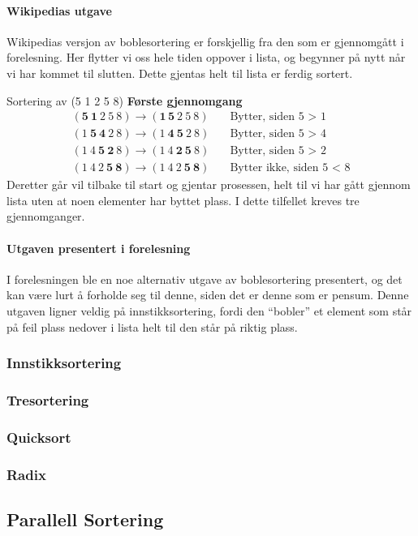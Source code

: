 \paragraph*{Wikipedias utgave}
Wikipedias versjon av boblesortering er forskjellig fra den som er gjennomgått i forelesning.
Her flytter vi oss hele tiden oppover i lista, og begynner på nytt når vi har kommet til slutten.
Dette gjentas helt til lista er ferdig sortert.

\begin{eks} Sortering av (5 1 2 5 8) \newline
  \textbf{Første gjennomgang}
  \begin{align*}
    (\mathbf{5}~ \mathbf{1}~ 2~ 5~ 8) \rightarrow (\mathbf{1}\, \mathbf{5} ~ 2 ~ 5 ~ 8) &\quad \text{Bytter, siden 5 > 1} \\
    (1~ \mathbf{5}~ \mathbf{4}~ 2~ 8) \rightarrow (1 ~ \mathbf{4} ~ \mathbf{5} ~ 2 ~ 8) &\quad \text{Bytter, siden 5 > 4} \\
    (1~ 4~ \mathbf{5}~ \mathbf{2}~ 8) \rightarrow (1~ 4~ \mathbf{2}~ \mathbf{5}~ 8)     &\quad \text{Bytter, siden 5 > 2} \\
    (1~ 4~ 2~ \mathbf{5}~ \mathbf{8}) \rightarrow (1~ 4~ 2~ \mathbf{5}~ \mathbf{8})     &\quad \text{Bytter ikke, siden 5 < 8}
  \end{align*}
  Deretter går vil tilbake til start og gjentar prosessen, helt til vi har gått gjennom lista uten at noen elementer har byttet plass.
  I dette tilfellet kreves tre gjennomganger.
\end{eks}


\paragraph*{Utgaven presentert i forelesning}
I forelesningen ble en noe alternativ utgave av boblesortering presentert, og det kan være lurt å forholde seg til denne, siden det er denne som er pensum.
Denne utgaven ligner veldig på innstikksortering, fordi den ``bobler'' et element som står på feil plass nedover i lista helt til den står på riktig plass.




\subsubsection{\color{red}Innstikksortering}\label{insertion}
\subsubsection{\color{red}Tresortering}
\subsubsection{\color{red}Quicksort}
\label{quick}
\subsubsection{\color{red}Radix}

\subsection{\color{red}Parallell Sortering}
